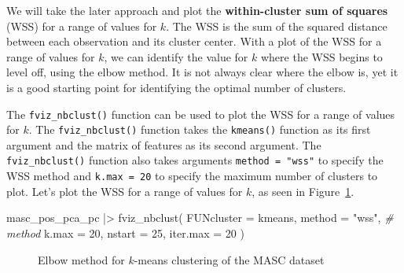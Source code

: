 \documentclass[
  letterpaper,
]{latex/krantz}
\newenvironment{Shaded}{\begin{snugshade}}{\end{snugshade}}
\newcommand{\AttributeTok}[1]{\textcolor[rgb]{0.00,0.00,0.00}{#1}}
\newcommand{\CommentTok}[1]{\textcolor[rgb]{0.00,0.00,0.00}{\textit{#1}}}
\newcommand{\DecValTok}[1]{\textcolor[rgb]{0.00,0.00,0.00}{#1}}
\newcommand{\FunctionTok}[1]{\textcolor[rgb]{0.00,0.00,0.00}{#1}}
\newcommand{\NormalTok}[1]{\textcolor[rgb]{0.00,0.00,0.00}{#1}}
\newcommand{\SpecialCharTok}[1]{\textcolor[rgb]{0.00,0.00,0.00}{#1}}
\newcommand{\StringTok}[1]{\textcolor[rgb]{0.00,0.00,0.00}{#1}}
\theoremstyle{definition}
\theoremstyle{remark}
\begin{document}
We will take the later approach and plot the \textbf{within-cluster sum
of squares} (WSS) for a range of values for \(k\). The WSS is the sum of
the squared distance between each observation and its cluster center.
With a plot of the WSS for a range of values for \(k\), we can identify
the value for \(k\) where the WSS begins to level off, using the elbow
method. It is not always clear where the elbow is, yet it is a good
starting point for identifying the optimal number of clusters.

The \texttt{fviz\_nbclust()} function can be used to plot the WSS for a
range of values for \(k\). The \texttt{fviz\_nbclust()} function takes
the \texttt{kmeans()} function as its first argument and the matrix of
features as its second argument. The \texttt{fviz\_nbclust()} function
also takes arguments \texttt{method\ =\ "wss"} to specify the WSS method
and \texttt{k.max\ =\ 20} to specify the maximum number of clusters to
plot. Let's plot the WSS for a range of values for \(k\), as seen in
Figure~\ref{fig-explore-masc-pos-kmeans-elbow}.

\begin{Shaded}
\begin{Highlighting}[]
\NormalTok{masc\_pos\_pca\_pc }\SpecialCharTok{|\textgreater{}}
  \FunctionTok{fviz\_nbclust}\NormalTok{(}
    \AttributeTok{FUNcluster =}\NormalTok{ kmeans,}
    \AttributeTok{method =} \StringTok{"wss"}\NormalTok{, }\CommentTok{\# method}
    \AttributeTok{k.max =} \DecValTok{20}\NormalTok{,}
    \AttributeTok{nstart =} \DecValTok{25}\NormalTok{,}
    \AttributeTok{iter.max =} \DecValTok{20}
\NormalTok{  )}
\end{Highlighting}
\end{Shaded}

\begin{figure}[!htb]


\caption{\label{fig-explore-masc-pos-kmeans-elbow}Elbow method for
\(k\)-means clustering of the MASC dataset}

\end{figure}%
\end{document}
